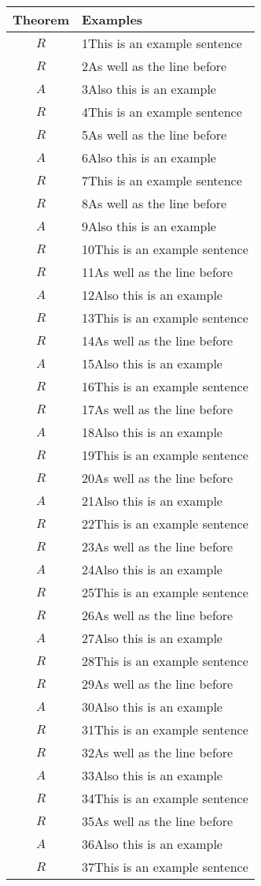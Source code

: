 \begin{longtable}{@{}c|X@{}}  
\toprule
\textbf{Theorem} & \textbf{Examples} \\[6pt]
\midrule
\endhead
$R$ & 1This is an example sentence \\[6pt]
$R$ & 2As well as the line before \\[6pt]
$A$ & 3Also this is an example \\[6pt]
$R$ & 4This is an example sentence \\[6pt]
$R$ & 5As well as the line before \\[6pt]
$A$ & 6Also this is an example \\[6pt]
$R$ & 7This is an example sentence \\[6pt]
$R$ & 8As well as the line before \\[6pt]
$A$ & 9Also this is an example \\[6pt]
$R$ & 10This is an example sentence \\[6pt]
$R$ & 11As well as the line before \\[6pt]
$A$ & 12Also this is an example \\[6pt]
$R$ & 13This is an example sentence \\[6pt]
$R$ & 14As well as the line before \\[6pt]
$A$ & 15Also this is an example \\[6pt]
$R$ & 16This is an example sentence \\[6pt]
$R$ & 17As well as the line before \\[6pt]
$A$ & 18Also this is an example \\[6pt]
$R$ & 19This is an example sentence \\[6pt]
$R$ & 20As well as the line before \\[6pt]
$A$ & 21Also this is an example \\[6pt]
$R$ & 22This is an example sentence \\[6pt]
$R$ & 23As well as the line before \\[6pt]
$A$ & 24Also this is an example \\[6pt]
$R$ & 25This is an example sentence \\[6pt]
$R$ & 26As well as the line before \\[6pt]
$A$ & 27Also this is an example \\[6pt]
$R$ & 28This is an example sentence \\[6pt]
$R$ & 29As well as the line before \\[6pt]
$A$ & 30Also this is an example \\[6pt]
$R$ & 31This is an example sentence \\[6pt]
$R$ & 32As well as the line before \\[6pt]
$A$ & 33Also this is an example \\[6pt]
$R$ & 34This is an example sentence \\[6pt]
$R$ & 35As well as the line before \\[6pt]
$A$ & 36Also this is an example \\[6pt]
$R$ & 37This is an example sentence \\[6pt]
\bottomrule
\end{longtable}